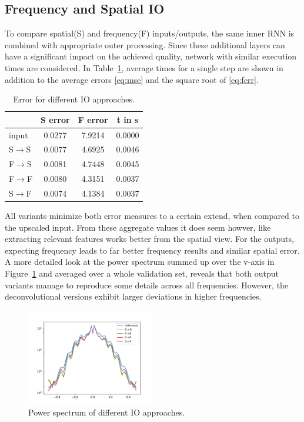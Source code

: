 \documentclass[sigconf]{acmart}
\begin{document}
\subsection{Frequency and Spatial IO}
To compare spatial(S) and frequency(F) inputs/outputs, the same inner RNN is combined with appropriate outer processing. Since these additional layers can have a significant impact on the achieved quality, network with similar execution times are considered. In Table~\ref{tab:freqIO}, average times for a single step are shown in addition to the average errors \eqref{eq:mse} and the square root of \eqref{eq:ferr}.
\begin{table}
\centering
\caption{Error for different IO approaches.}
\label{tab:freqIO}
\begin{tabular}{lccc}
	\hline
	    & S error & F error & t in s \\ \hline
	input           & 0.0277 & 7.9214 & 0.0000 \\
	S$\rightarrow$S & 0.0077 & 4.6925 & 0.0046 \\
	F$\rightarrow$S & 0.0081 & 4.7448 & 0.0045 \\
	F$\rightarrow$F & 0.0080 & 4.3151 & 0.0037 \\
	S$\rightarrow$F & 0.0074 & 4.1384 & 0.0037 \\ \hline
\end{tabular}
\end{table}
All variants minimize both error measures to a certain extend, when compared to the upscaled input.
From these aggregate values it does seem howver, like extracting relevant features works better from the spatial view. For the outputs, expecting frequency leads to far better frequency results and similar spatial error.
A more detailed look at the power spectrum summed up over the v-axis in Figure~\ref{powerspectrum} and averaged over a whole validation set, reveals that both output variants manage to reproduce some details across all frequencies. However, the deconvolutional versions exhibit larger deviations in higher frequencies.
\begin{figure}
	\includegraphics[width=0.5\textwidth]{imgs/powerspectrum.pdf}
	\caption{Power spectrum of different IO approaches.}
	\label{powerspectrum}
\end{figure}
\end{document}
